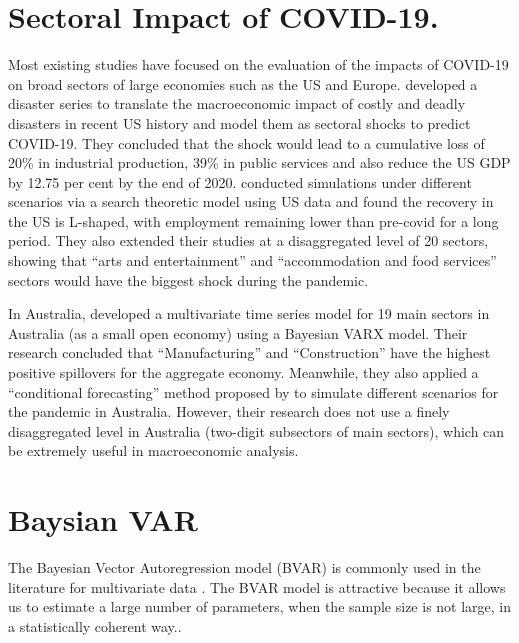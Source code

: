 \documentclass{monashthesis}
\begin{document}
\hypertarget{sectoral-impact-of-covid-19.}{%
\section{Sectoral Impact of COVID-19.}\label{sectoral-impact-of-covid-19.}}

Most existing studies have focused on the evaluation of the impacts of COVID-19 on broad sectors of large economies such as the US and Europe. \textcite{ludvigson2020covid} developed a disaster series to translate the macroeconomic impact of costly and deadly disasters in recent US history and model them as sectoral shocks to predict COVID-19. They concluded that the shock would lead to a cumulative loss of 20\% in industrial production, 39\% in public services and also reduce the US GDP by 12.75 per cent by the end of 2020. \textcite{gregory2020pandemic} conducted simulations under different scenarios via a search theoretic model using US data and found the recovery in the US is L-shaped, with employment remaining lower than pre-covid for a long period. They also extended their studies at a disaggregated level of 20 sectors, showing that ``arts and entertainment'' and ``accommodation and food services'' sectors would have the biggest shock during the pandemic.

In Australia, \textcite{anderson2020} developed a multivariate time series model for 19 main sectors in Australia (as a small open economy) using a Bayesian VARX model. Their research concluded that ``Manufacturing'' and ``Construction'' have the highest positive spillovers for the aggregate economy. Meanwhile, they also applied a ``conditional forecasting'' method proposed by \textcite{waggoner1999} to simulate different scenarios for the pandemic in Australia. However, their research does not use a finely disaggregated level in Australia (two-digit subsectors of main sectors), which can be extremely useful in macroeconomic analysis.

\hypertarget{baysian-var}{%
\section{Baysian VAR}\label{baysian-var}}

The Bayesian Vector Autoregression model (BVAR) is commonly used in the literature for multivariate data \autocites[e.g.][]{anderson2020,litterman1986,banbura2010large}. The BVAR model is attractive because it allows us to estimate a large number of parameters, when the sample size is not large, in a statistically coherent way.\autocite{litterman1986,wozniak2016bayesian}.
\end{document}
